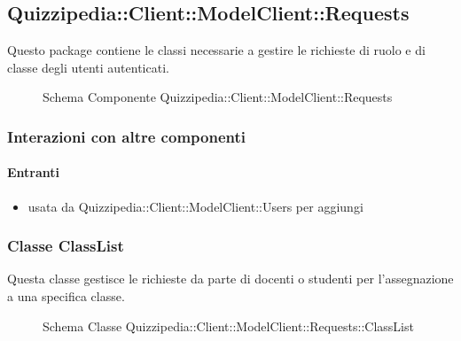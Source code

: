 \subsection{Quizzipedia::Client::ModelClient::Requests}
Questo package contiene le classi necessarie a gestire le richieste di ruolo e di classe degli utenti autenticati.
\begin{figure}[H]
\centering
\noindent{}
\caption[Schema Componente Quizzipedia::Client::ModelClient::Requests]{Schema Componente Quizzipedia::Client::ModelClient::Requests}
\end{figure}
\subsubsection{Interazioni con altre componenti}
\paragraph{Entranti}
\begin{itemize}
\item usata da Quizzipedia::Client::ModelClient::Users per aggiungi
\end{itemize}
\subsubsection{Classe ClassList}
Questa classe gestisce le richieste da parte di docenti o studenti per l'assegnazione a una specifica classe.
\begin{figure}[H]
\centering
\noindent{}
\caption[Schema Classe ClassList]{Schema Classe Quizzipedia::Client::ModelClient::Requests::ClassList}
\end{figure}
